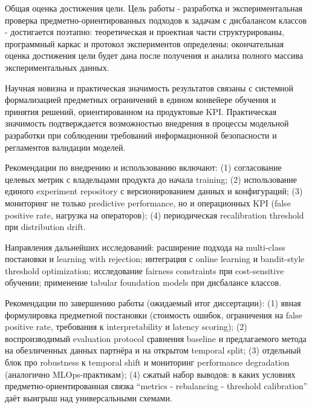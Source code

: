 Общая оценка достижения цели. Цель работы - разработка и экспериментальная проверка предметно-ориентированных подходов к задачам с дисбалансом классов - достигается поэтапно: теоретическая и проектная части структурированы, программный каркас и протокол экспериментов определены; окончательная оценка достижения цели будет дана после получения и анализа полного массива экспериментальных данных.

Научная новизна и практическая значимость результатов связаны с системной формализацией предметных ограничений в едином конвейере обучения и принятия решений, ориентированном на продуктовые KPI. Практическая значимость подтверждается возможностью внедрения в процессы модельной разработки при соблюдении требований информационной безопасности и регламентов валидации моделей.

Рекомендации по внедрению и использованию включают: (1) согласование целевых метрик с владельцами продукта до начала training; (2) использование единого experiment repository с версионированием данных и конфигураций; (3) мониторинг не только predictive performance, но и операционных KPI (false positive rate, нагрузка на операторов); (4) периодическая recalibration threshold при distribution drift.

Направления дальнейших исследований: расширение подхода на multi-class постановки и learning with rejection; интеграция с online learning и bandit-style threshold optimization; исследование fairness constraints при cost-sensitive обучении; применение tabular foundation models при дисбалансе классов.

Рекомендации по завершению работы (ожидаемый итог диссертации): (1) явная формулировка предметной постановки (стоимость ошибок, ограничения на false positive rate, требования к interpretability и latency scoring); (2) воспроизводимый evaluation protocol сравнения baseline и предлагаемого метода на обезличенных данных партнёра и на открытом temporal split; (3) отдельный блок про robustness к temporal shift и мониторинг performance degradation (аналогично MLOps-практикам); (4) сжатый набор выводов: в каких условиях предметно-ориентированная связка ``metrics - rebalancing - threshold calibration'' даёт выигрыш над универсальными схемами.
